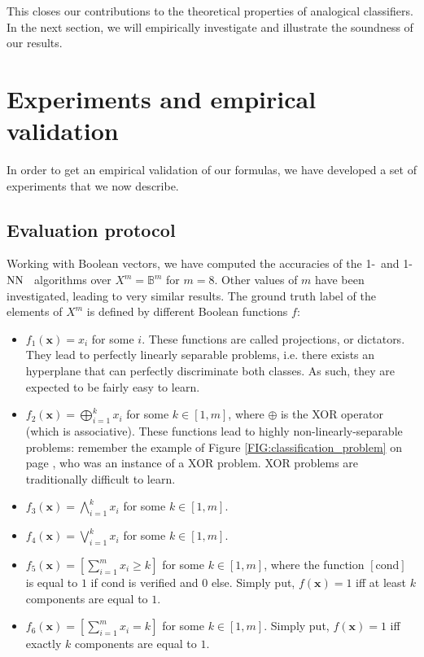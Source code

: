 This closes our contributions to the theoretical properties of analogical
classifiers. In the next section, we will empirically investigate and illustrate the
soundness of our results.

\section{Experiments and empirical validation}
\label{SEC:experiments_and_empirical_validation}
In order to get an empirical validation of our formulas, we have developed a
set of experiments that we now describe.

\subsection{Evaluation protocol}

Working with Boolean vectors, we have computed the accuracies of the 1-\NAN~and
1-$\text{NN}$~ algorithms over $X^m=\mathbb{B}^m$ for $m = 8$. Other values of $m$ have
been investigated, leading to very similar results.  The ground truth label of
the elements of $X^m$ is defined by different Boolean functions $f$:
\begin{itemize}
\item $f_1(\mathbf{x})=x_i$ for some $i$. These functions are called
  projections, or dictators.  They lead to perfectly linearly separable
    problems, i.e. there exists an hyperplane that can perfectly discriminate
    both classes. As such, they are expected to be fairly easy to learn.
  \item $f_2(\mathbf{x})= \bigoplus_{i = 1}^k  x_i$ for some $k \in[1, m]$, where $\oplus$
    is the XOR operator (which is associative). These functions
    lead to highly non-linearly-separable problems: remember the example of
    Figure \ref{FIG:classification_problem} on page
    \pageref{FIG:classification_problem}, who was an instance of a XOR problem.
    XOR problems are traditionally difficult to learn.
  \item $f_3(\mathbf{x})= \bigwedge_{i = 1}^k  x_i$ for some $k \in [1, m]$.
  \item $f_4(\mathbf{x})= \bigvee_{i = 1}^k  x_i$ for some $k\in [1, m]$.
  \item $f_5(\mathbf{x}) = \left[\sum_{i = 1}^m x_i \geq k\right]$ for some $k
    \in [1, m]$, where the function $[\text{cond}]$ is equal to $1$ if cond is
    verified and $0$ else. Simply put, $f(\mathbf{x}) = 1$ iff at least $k$
    components are equal to $1$.
  \item $f_6(\mathbf{x}) = \left[\sum_{i = 1}^m x_i = k\right]$ for some $k
    \in [1, m]$. Simply put, $f(\mathbf{x}) = 1$ iff exactly $k$ components
    are equal to $1$.
\end{itemize}



